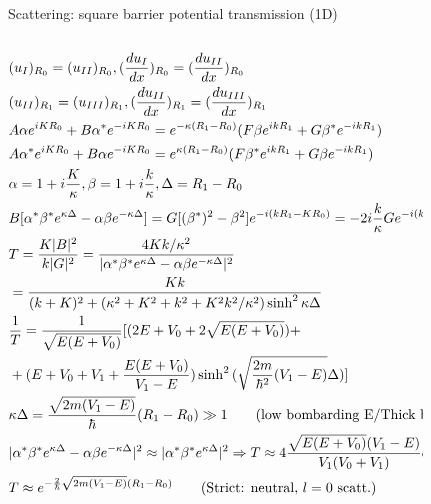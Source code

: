 \begin{frame}{Scattering: square barrier potential transmission (1D)}
    \begin{columns}[T]
        \begin{column}{0.7\textwidth}
            \begin{align*}
                &(u_I)_{R_0}=(u_{II})_{R_0}, (\TDy{x}{u_I})_{R_0}=(\TDy{x}{u_{II}})_{R_0}\\
                &(u_{II})_{R_1}=(u_{III})_{R_1}, (\TDy{x}{u_{II}})_{R_1}=(\TDy{x}{u_{III}})_{R_1}\\
                &A\alpha\exp{iKR_0}+B\alpha^*\exp{-iKR_0}=\exp{-\kappa(R_1-R_0)}(F\beta\exp{ikR_1}+G\beta^*\exp{-ikR_1})\\
                &A\alpha^*\exp{iKR_0}+B\alpha\exp{-iKR_0}=\exp{\kappa(R_1-R_0)}(F\beta^*\exp{ikR_1}+G\beta\exp{-ikR_1})\\
                &\alpha=1+i \frac{K}{\kappa}, \beta=1+i\frac{k}{\kappa}, \Delta=R_1-R_0\\
                &B[\alpha^*\beta^*\exp{\kappa\Delta}-\alpha\beta\exp{-\kappa\Delta}]=G[(\beta^*)^2-\beta^2]\exp{-i(kR_1-KR_0)}=-2i \frac{k}{\kappa}G\exp{-i(kR_1-KR_0)}\\
                &T=\frac{K|B|^2}{k|G|^2}=\frac{4Kk/\kappa^2}{|\alpha^*\beta^*\exp{\kappa\Delta}-\alpha\beta\exp{-\kappa\Delta}|^2}\\
                &=\frac{Kk}{(k+K)^2+(\kappa^2+K^2+k^2+K^2k^2/\kappa^2)\sinh^2{\kappa\Delta}}\\
                &\frac{1}{T}=\frac{1}{\sqrt{E(E+V_0)}}[(2E+V_0+2 \sqrt{E(E+V_0)})+\\
                &+(E+V_0+V_1+\frac{E(E+V_0)}{V_1-E})\sinh^2{(\sqrt{\frac{2m}{\hbar^2}(V_1-E)}\Delta)}]\\
                &\kappa\Delta=\frac{\sqrt{2m(V_1-E)}}{\hbar}(R_1-R_0)\gg1\tag{low bombarding E/Thick barrier}\\
                &|\alpha^*\beta^*\exp{\kappa\Delta}-\alpha\beta\exp{-\kappa\Delta}|^2\approx|\alpha^*\beta^*\exp{\kappa\Delta}|^2\Rightarrow T\approx4 \frac{\sqrt{E(E+V_0)}(V_1-E)}{V_1(V_0+V_1)}\exp{-2\kappa(R_1-R_0)}\\
                &T\approx\exp{-\frac{2}{\hbar}\sqrt{2m(V_1-E)}(R_1-R_0)}\tag{Strict: neutral, $l=0$ scatt.}
            \end{align*}
        \end{column}
        \begin{column}{0.25\textwidth}
            \begin{figure}[!ht]

\end{figure}
\end{column}
\end{columns}
\end{frame}
